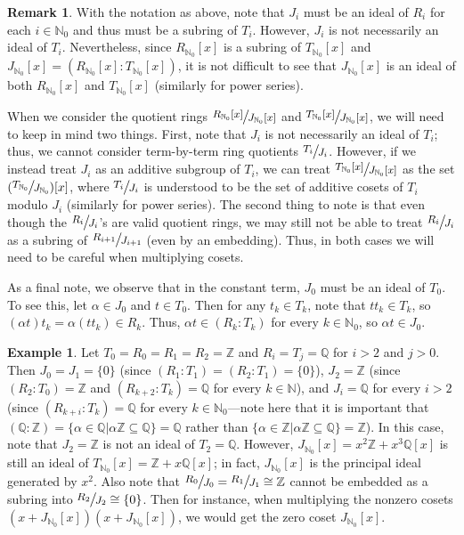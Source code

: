 \documentclass[12pt]{amsart}
\theoremstyle{definition}
\newtheorem{example}[theorem]{Example}
\newtheorem*{remark}{Remark}
\newcommand{\bZ}{\mathbb Z}
\newcommand{\bQ}{\mathbb Q}
\newcommand{\bN}{\mathbb N}
\newcommand{\bNo}{{{\mathbb N}_0}}
\newcommand{\quot}[2]{\large\sfrac{#1}{#2}\normalsize}
\begin{document}
\begin{remark}
    With the notation as above, note that $J_i$ must be an ideal of $R_i$ for each $i\in\bN_0$ and thus must be a subring of $T_i$. However, $J_i$ is not necessarily an ideal of $T_i$. Nevertheless, since $R_{\bNo}[x]$ is a subring of $T_{\bNo}[x]$ and $J_{\bNo}[x]=(R_{\bNo}[x]:T_{\bNo}[x])$, it is not difficult to see that $J_{\bNo}[x]$ is an ideal of both $R_{\bNo}[x]$ and $T_{\bNo}[x]$ (similarly for power series).

    When we consider the quotient rings $\quot{R_{\bNo}[x]}{J_{\bNo}[x]}$ and $\quot{T_{\bNo}[x]}{J_{\bNo}[x]}$, we will need to keep in mind two things. First, note that $J_i$ is not necessarily an ideal of $T_i$; thus, we cannot consider term-by-term ring quotients $\quot{T_i}{J_i}$. However, if we instead treat $J_i$ as an additive subgroup of $T_i$, we can treat $\quot{T_{\bNo}[x]}{J_{\bNo}[x]}$ as the set $(\quot{T_\bNo}{J_\bNo})[x]$, where $\quot{T_{i}}{J_{i}}$ is understood to be the set of additive cosets of $T_i$ modulo $J_i$ (similarly for power series). The second thing to note is that even though the $\quot{R_i}{J_i}$'s are valid quotient rings, we may still not be able to treat $\quot{R_i}{J_i}$ as a subring of $\quot{R_{i+1}}{J_{i+1}}$ (even by an embedding). Thus, in both cases we will need to be careful when multiplying cosets.

    As a final note, we observe that in the constant term, $J_0$ must be an ideal of $T_0$. To see this, let $\alpha\in J_0$ and $t\in T_0$. Then for any $t_k\in T_k$, note that $tt_k\in T_k$, so $(\alpha t)t_k=\alpha(tt_k)\in R_k$. Thus, $\alpha t\in (R_k:T_k)$ for every $k\in\bN_0$, so $\alpha t\in J_0$.
\end{remark}

\begin{example}
    \label{conductor ideal example}
    Let $T_0=R_0=R_1=R_2=\bZ$ and $R_i=T_j=\bQ$ for $i> 2$ and $j>0$. Then $J_0=J_1=\{0\}$ (since $(R_1:T_1)=(R_2:T_1)=\{0\}$), $J_2=\bZ$ (since $(R_2:T_0)=\bZ$ and $(R_{k+2}:T_k)=\bQ$ for every $k\in\bN$), and $J_i=\bQ$ for every $i>2$ (since $(R_{k+i}:T_k)=\bQ$ for every $k\in\bN_0$---note here that it is important that $(\bQ:\bZ)=\{\alpha\in\bQ|\alpha\bZ\subseteq\bQ\}=\bQ$ rather than $\{\alpha\in\bZ|\alpha\bZ\subseteq\bQ\}=\bZ$). In this case, note that $J_2=\bZ$ is not an ideal of $T_2=\bQ$. However, $J_{\bNo}[x]=x^2\bZ+x^3\bQ[x]$ is still an ideal of $T_{\bNo}[x]=\bZ+x\bQ[x]$; in fact, $J_{\bNo}[x]$ is the principal ideal generated by $x^2$. Also note that $\quot{R_0}{J_0}=\quot{R_1}{J_1}\cong \bZ$ cannot be embedded as a subring into $\quot{R_2}{J_2}\cong \{0\}$. Then for instance, when multiplying the nonzero cosets $(x+J_{\bN_0}[x])(x+J_\bNo[x])$, we would get the zero coset $J_{\bNo}[x]$.
\end{example}
\end{document}
